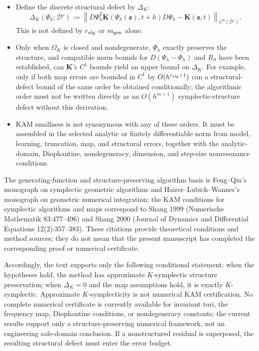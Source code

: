 \begin{itemize}
\tightlist
\item
  Define the discrete structural defect by \(\Delta_K\):
  \[
  \Delta_{K}(\Psi_h;\mathcal{D}'):=\left\|D\Psi_h^{T}\mathbf{K}\left(\Psi_h(\mathbf{z}),t+h\right)D\Psi_h-\mathbf{K}(\mathbf{z},t)\right\|_{C^{0}(\mathcal{D}')}.
  \]
  This is not defined by \(r_{\rm alg}\) or \(m_{\rm gen}\) alone.
\item
  Only when \(\Omega_K\) is closed and nondegenerate, \(\Phi_h\) exactly preserves the structure, and compatible norm bounds for \(D(\Psi_h-\Phi_h)\) and \(R_S\) have been established, can \(\mathbf{K}\)'s \(C^{1}\) bounds yield an upper bound on \(\Delta_K\). For example, only if both map errors are bounded in \(C^{1}\) by \(O(h^{r_{\rm alg}+1})\) can a structural-defect bound of the same order be obtained conditionally; the algorithmic order must not be written directly as an \(O(h^{m+1})\) symplectic-structure defect without this derivation.
\item
  KAM smallness is not synonymous with any of these orders. It must be assembled in the selected analytic or finitely differentiable norm from model, learning, truncation, map, and structural errors, together with the analytic-domain, Diophantine, nondegeneracy, dimension, and step-size nonresonance conditions.
\end{itemize}

The generating-function and structure-preserving algorithm basis is Feng--Qin's monograph on symplectic geometric algorithms and Hairer--Lubich--Wanner's monograph on geometric numerical integration; the KAM conditions for symplectic algorithms and maps correspond to Shang 1999 (Numerische Mathematik 83:477--496) and Shang 2000 (Journal of Dynamics and Differential Equations 12(2):357--383)\cite{FengQin2010,HairerLubichWanner2006GNI,Shang1999KAMAlgorithms,Shang2000KAMMappings}. These citations provide theoretical conditions and method sources; they do not mean that the present manuscript has completed the corresponding proof or numerical certificate.

Accordingly, the text supports only the following conditional statement: when the hypotheses hold, the method has approximate \(K\)-symplectic structure preservation; when \(\Delta_K=0\) and the map assumptions hold, it is exactly \(K\)-symplectic. Approximate \(K\)-symplecticity is not numerical KAM certification. No complete numerical certificate is currently available for invariant tori, the frequency map, Diophantine conditions, or nondegeneracy constants; the current results support only a structure-preserving numerical framework, not an engineering safe-domain conclusion. If a nonstructured residual is superposed, the resulting structural defect must enter the error budget.

